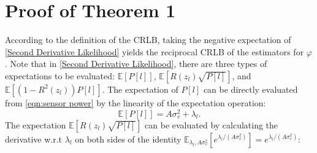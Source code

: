 \documentclass[journal,twocolumn]{IEEEtran}
\theoremstyle{nonumberplain}
\begin{document}
\section{Proof of \textbf{Theorem 1}}\label{appendix:proof of theorem1}
    According to the definition of the CRLB, taking the negative expectation of \eqref{Second Derivative Likelihood} yields the reciprocal CRLB of the estimators for $\varphi$. Note that in \eqref{Second Derivative Likelihood}, there are three types of expectations to be evaluated: $\mathbb{E}\left[P[l]\right]$, $\mathbb{E}\left[R(z_l)\sqrt{P[l]}\right]$, and $\mathbb{E}\left[(1-R^2(z_l))P[l]\right]$. The expectation of $P[l]$ can be directly evaluated from \eqref{eqn:sensor power} by the linearity of the expectation operation:
    \begin{equation}
        \mathbb{E}\left[P[l]\right] = A\sigma_v^2 + \lambda_l.
        \label{eqn:expectation of P_l}
    \end{equation}
    The expectation $\mathbb{E}\left[R(z_l) \sqrt{P[l]}\right]$ can be evaluated by calculating the derivative w.r.t $\lambda_l$ on both sides of the identity $\mathbb{E}_{\lambda_l, A\sigma_v^2}[e^{\lambda_l/(A\sigma_v^2)}]=e^{\lambda_l/(A\sigma_v^2)}$:
\end{document}
